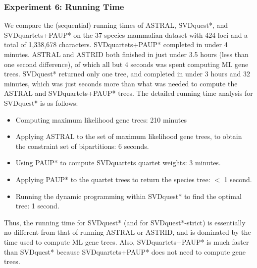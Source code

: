 \subsubsection{Experiment 6: Running Time}
We compare the (sequential) running times of ASTRAL,  SVDquest*, and SVDquartets+PAUP* 
on the 37-species mammalian dataset with 424 loci and a total of 1,338,678 characters.  
SVDquartets+PAUP* completed in under 4 minutes. 
ASTRAL and ASTRID both finished in just under 3.5 hours (less than one second difference),   of which all but 4 seconds was spent computing ML gene trees. 
SVDquest*  returned only one tree, and 
completed in under 3 hours and 32 minutes, which was just seconds more than what was needed to compute the ASTRAL and SVDquartets+PAUP* trees.
The detailed running time analysis for SVDquest* is as follows:
\begin{itemize}
\item
Computing maximum likelihood gene trees: 210 minutes
\item
Applying ASTRAL to the set of maximum likelihood gene trees, to obtain the constraint set of bipartitions: 6 seconds.
\item 
Using PAUP* to compute SVDquartets  quartet weights: 3 minutes.   
\item
Applying  PAUP* to the quartet trees to return the species tree:  $<$ 1 second.
\item
Running the dynamic programming within SVDquest* to find   the optimal tree: 1 second.
\end{itemize}
Thus,  the running time for SVDquest* (and for SVDquest*-strict) is essentially no different from that of running ASTRAL or ASTRID, and is dominated by the time used to compute ML gene trees. 
Also, SVDquartets+PAUP* is much faster than SVDquest*  because SVDquartets+PAUP* does not need to compute gene trees. 


\clearpage

